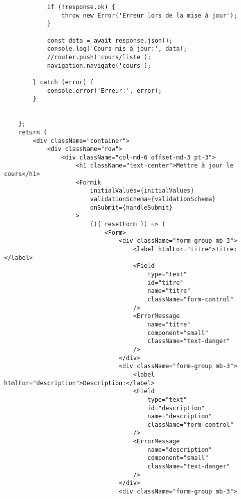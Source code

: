 \documentclass[10pt,a4paper]{article}
\begin{document}
\begin{verbatim}
            if (!response.ok) {
                throw new Error('Erreur lors de la mise à jour');
            }
    
            const data = await response.json();
            console.log('Cours mis à jour:', data);
            //router.push('cours/liste');
            navigation.navigate('cours');
    
        } catch (error) {
            console.error('Erreur:', error);
        }
    
 
    };
    return (
        <div className="container">
            <div className="row">
                <div className="col-md-6 offset-md-3 pt-3">
                    <h1 className="text-center">Mettre à jour le cours</h1>
                    <Formik
                        initialValues={initialValues}
                        validationSchema={validationSchema}
                        onSubmit={handleSubmit}
                    >
                        {({ resetForm }) => (
                            <Form>
                                <div className="form-group mb-3">
                                    <label htmlFor="titre">Titre:</label>
                                    <Field
                                        type="text"
                                        id="titre"
                                        name="titre"
                                        className="form-control"
                                    />
                                    <ErrorMessage
                                        name="titre"
                                        component="small"
                                        className="text-danger"
                                    />
                                </div>
                                <div className="form-group mb-3">
                                    <label htmlFor="description">Description:</label>
                                    <Field
                                        type="text"
                                        id="description"
                                        name="description"
                                        className="form-control"
                                    />
                                    <ErrorMessage
                                        name="description"
                                        component="small"
                                        className="text-danger"
                                    />
                                </div>
                                <div className="form-group mb-3">

\end{verbatim}
\end{document}
